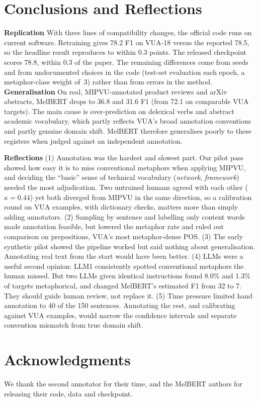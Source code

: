 \documentclass[11pt]{article}
\begin{document}
\section{Conclusions and Reflections}

\textbf{Replication} With three lines of compatibility changes, the official code runs on current software. Retraining gives 78.2 F1 on VUA-18 versus the reported 78.5, so the headline result reproduces to within 0.3 points. The released checkpoint scores 78.8, within 0.3 of the paper. The remaining differences come from seeds and from undocumented choices in the code (test-set evaluation each epoch, a metaphor-class weight of~3) rather than from errors in the method.
\textbf{Generalisation} On real, MIPVU-annotated product reviews and arXiv abstracts, MelBERT drops to 36.8 and 31.6 F1 (from 72.1 on comparable VUA targets). The main cause is over-prediction on delexical verbs and abstract academic vocabulary, which partly reflects VUA's broad annotation conventions and partly genuine domain shift. MelBERT therefore generalises poorly to these registers when judged against an independent annotation.

\textbf{Reflections} (1) Annotation was the hardest and slowest part. Our pilot pass showed how easy it is to miss conventional metaphors when applying MIPVU, and deciding the ``basic'' sense of technical vocabulary (\textit{network}, \textit{framework}) needed the most adjudication. Two untrained humans agreed with each other ($\kappa = 0.44$) yet both diverged from MIPVU in the same direction, so a calibration round on VUA examples, with dictionary checks, matters more than simply adding annotators. (2) Sampling by sentence and labelling only content words made annotation feasible, but lowered the metaphor rate and ruled out comparison on prepositions, VUA's most metaphor-dense POS. (3) The early synthetic pilot showed the pipeline worked but said nothing about generalisation. Annotating real text from the start would have been better. (4) LLMs were a useful second opinion: LLM1 consistently spotted conventional metaphors the human missed. But two LLMs given identical instructions found 8.0\% and 1.3\% of targets metaphorical, and changed MelBERT's estimated F1 from 32 to 7. They should guide human review, not replace it. (5) Time pressure limited hand annotation to 40 of the 150 sentences. Annotating the rest, and calibrating against VUA examples, would narrow the confidence intervals and separate convention mismatch from true domain shift.

\section*{Acknowledgments}
We thank the second annotator for their time, and the MelBERT authors for releasing their code, data and checkpoint.


\end{document}
